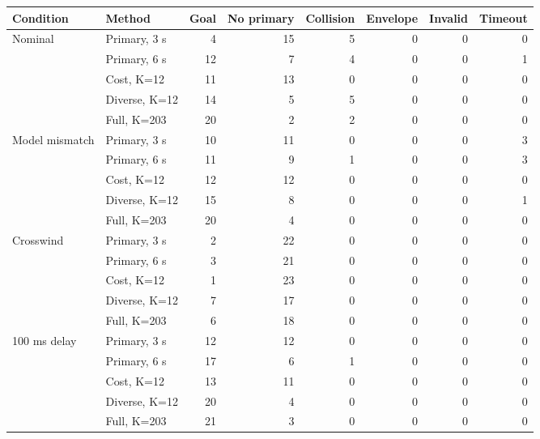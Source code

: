 \begin{tabular}{llrrrrrr}
\toprule
Condition & Method & Goal & No primary & Collision & Envelope & Invalid & Timeout \\
\midrule
Nominal & Primary, 3 s & 4 & 15 & 5 & 0 & 0 & 0 \\
 & Primary, 6 s & 12 & 7 & 4 & 0 & 0 & 1 \\
 & Cost, K=12 & 11 & 13 & 0 & 0 & 0 & 0 \\
 & Diverse, K=12 & 14 & 5 & 5 & 0 & 0 & 0 \\
 & Full, K=203 & 20 & 2 & 2 & 0 & 0 & 0 \\
\midrule
Model mismatch & Primary, 3 s & 10 & 11 & 0 & 0 & 0 & 3 \\
 & Primary, 6 s & 11 & 9 & 1 & 0 & 0 & 3 \\
 & Cost, K=12 & 12 & 12 & 0 & 0 & 0 & 0 \\
 & Diverse, K=12 & 15 & 8 & 0 & 0 & 0 & 1 \\
 & Full, K=203 & 20 & 4 & 0 & 0 & 0 & 0 \\
\midrule
Crosswind & Primary, 3 s & 2 & 22 & 0 & 0 & 0 & 0 \\
 & Primary, 6 s & 3 & 21 & 0 & 0 & 0 & 0 \\
 & Cost, K=12 & 1 & 23 & 0 & 0 & 0 & 0 \\
 & Diverse, K=12 & 7 & 17 & 0 & 0 & 0 & 0 \\
 & Full, K=203 & 6 & 18 & 0 & 0 & 0 & 0 \\
\midrule
100 ms delay & Primary, 3 s & 12 & 12 & 0 & 0 & 0 & 0 \\
 & Primary, 6 s & 17 & 6 & 1 & 0 & 0 & 0 \\
 & Cost, K=12 & 13 & 11 & 0 & 0 & 0 & 0 \\
 & Diverse, K=12 & 20 & 4 & 0 & 0 & 0 & 0 \\
 & Full, K=203 & 21 & 3 & 0 & 0 & 0 & 0 \\
\bottomrule
\end{tabular}
